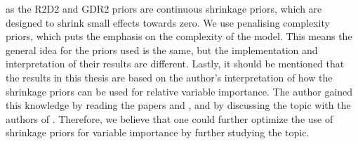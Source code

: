 as the R2D2 and GDR2 priors are continuous shrinkage priors, which are designed to shrink small effects towards zero. We use penalising complexity priors, which puts the emphasis on the complexity of the model. This means the general idea for the priors used is the same, but the implementation and interpretation of their results are different. Lastly, it should be mentioned that the results in this thesis are based on the author's interpretation of how the shrinkage priors can be used for relative variable importance. The author gained this knowledge by reading the papers \citet{zhang2020bayesian} and \citet{aguilar2024generalized}, and by discussing the topic with the authors of \citet{aguilar2024generalized}. Therefore, we believe that one could further optimize the use of shrinkage priors for variable importance by further studying the topic.
\\
\\
